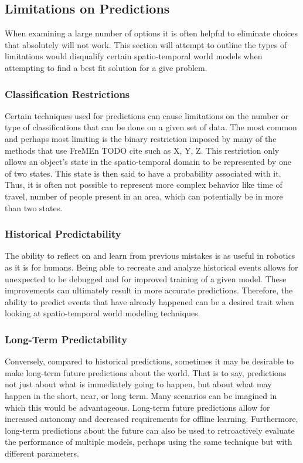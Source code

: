  \subsection { Limitations on Predictions }
  When examining a large number of options it is often helpful to eliminate
  choices that absolutely will not work. This section will attempt to outline
  the types of limitations would disqualify certain spatio-temporal world
  models when attempting to find a  best fit solution for a give problem.


  \subsubsection{ Classification Restrictions }
  Certain techniques used for predictions can cause limitations on the number
  or type of classifications that can be done on a given set of data. The most common
  and perhaps most limiting is the binary restriction imposed by many of the
  methods that use FreMEn TODO cite such as X, Y, Z. This restriction only
  allows an object's state in the spatio-temporal domain to be represented by one of two
  states. This state is then said to have a probability associated with it.
  Thus, it is often not possible to represent more complex behavior like time
  of travel, number of people present in an area, which can potentially be in
  more than two states.

  \subsubsection{ Historical Predictability }
  The ability to reflect on and learn from previous mistakes is as useful in
  robotics as it is for humans. Being able to recreate and analyze historical
  events allows for unexpected to be debugged and for
  improved training of a given model. These improvements can ultimately result
  in more accurate predictions. Therefore, the ability to predict events that
  have already happened can be a desired trait when looking at
  spatio-temporal world modeling techniques.

  \subsubsection{ Long-Term Predictability }
  Conversely, compared to historical predictions, sometimes it may be desirable
  to make long-term future predictions about the world. That is to say, predictions
  not just about what is immediately going to happen, but about what may happen
  in the short, near, or long term. Many scenarios can be imagined
  in which this would be advantageous. Long-term future predictions allow for
  increased autonomy and decreased requirements for offline learning.
  Furthermore, long-term predictions about the future can also be used to
  retroactively evaluate the performance of multiple models, perhaps using
  the same technique but with different parameters.


